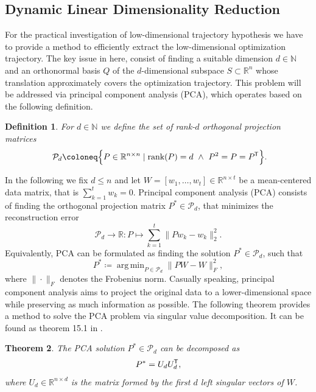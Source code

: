 \documentclass[11pt, a4paper]{article}
\newtheorem{theorem}{Theorem}[section]
\newtheorem{definition}[theorem]{Definition}
\newcommand{\N}{\mathbb{N}}
\newcommand{\R}{\mathbb{R}}
\renewcommand{\P}{\mathcal{P}}
\newcommand*{\tr}{^{\mkern-1.5mu\mathsf{T}}}
\DeclareMathOperator*{\argmin}{arg\,min}
\begin{document}
\subsection{Dynamic Linear Dimensionality Reduction} \label{sec:DLDR}

For the practical investigation of low-dimensional trajectory hypothesis we have to provide a method to efficiently extract the low-dimensional optimization trajectory. The key issue in here, consist of finding a suitable dimension $d \in \N$ and an orthonormal basis $Q$ of the $d$-dimensional subspace $S \subset \R^n$ whose translation approximately covers the optimization trajectory. This problem will be addressed via principal component analysis (PCA), which operates based on the following definition.

\begin{definition}
For $d \in \N$ we define the set of rank-$d$ orthogonal projection matrices
\[ \P_d \coloneq \Big \{ P \in \R^{n \times n} \mid \text{rank}(P) = d \ \wedge \ P^2 = P = P\tr  \Big \}. \]
\end{definition}

In the following we fix $d \leq n$ and let $W = [w_1, \dots, w_t] \in \R^{n \times t}$ be a mean-centered data matrix, that is $\sum_{k=1}^{t}w_k=0$. Principal component analysis (PCA) consists of finding the orthogonal projection matrix $P^* \in \P_d$, that minimizes the reconstruction error
\[ \P_d \to \R : P \mapsto \sum_{k=1}^{t} \big \| Pw_k - w_k \big \|_2^2. \]
Equivalently, PCA can be formulated as finding the solution $P^* \in \P_d$, such that
\[ P^* \coloneq \argmin_{P \in \P_d} \big \| PW - W \big \|_F^2, \]
where $\| \cdot \|_F$ denotes the Frobenius norm. Casually speaking, principal component analysis aims to project the original data to a lower-dimensional space while preserving as much information as possible. The following theorem provides a method to solve the PCA problem via singular value decomposition. It can be found as theorem 15.1 in \cite{PCA}.

\begin{theorem} \label{thm:pca}
The PCA solution $P^* \in \P_d$ can be decomposed as
\[ P^* = U_dU_d\tr , \]
where $U_d \in \R^{n \times d}$ is the matrix formed by the first $d$ left singular vectors of $W$.
\end{theorem}
\end{document}
